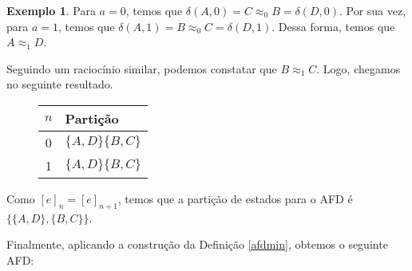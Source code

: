 \documentclass[a4paper]{article}
\theoremstyle{definition}
\newtheorem{Example}{Exemplo}
\begin{document}
\begin{Example}
    Para $a = 0$, temos que $\delta(A,0) = C \approx_0 B = \delta(D,0)$. Por sua
    vez, para $a = 1$, temos que $\delta(A,1) = B \approx_0 C = \delta(D,1)$.
    Dessa forma, temos que $A \approx_1 D$.

    Seguindo um raciocínio similar, podemos constatar que $B \approx_1 C$. Logo,
    chegamos no seguinte resultado.
    \begin{figure}[H]
      \begin{tabular}{|c|l|}
        \hline
        $n$ & Partição \\ \hline
        0   & $\{A,D\}\{B,C\}$ \\\hline
        1   & $\{A,D\}\{B,C\}$ \\\hline        
      \end{tabular}
      \centering
    \end{figure}
    Como $[e]_n = [e]_{n + 1}$, temos que a partição de estados para o AFD é
    $\{\{A,D\},\{B,C\}\}$.

    Finalmente, aplicando a construção da Definição \ref{afdmin}, obtemos o
    seguinte AFD:
    \begin{figure}[H]
      \centering
    \end{figure}
  \end{Example}
\end{document}
